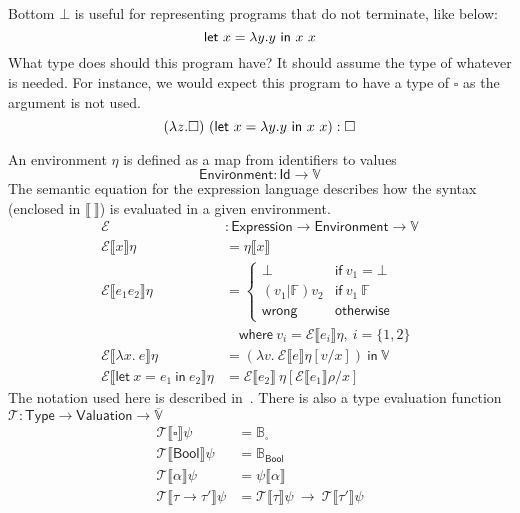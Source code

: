 Bottom $\bot$ is useful for representing programs that do not terminate,
like below:
\[\mathsf{let} \ x = \lambda y. y \ \mathsf{in} \ x \ x\]
What type does should this program have? It should assume the
type of whatever is needed. For instance, we would expect this program
to have a type of $\square$ as the argument is not used.
\[ (\lambda z. \square) \ (\mathsf{let} \ x = \lambda y. y \ \mathsf{in} \ x \ x) : \square \]


An environment $\eta$ is defined as a map from identifiers to values
\[ \mathsf{Environment} : \mathsf{Id} \rightarrow \mathbb{V} \]
The semantic equation for the expression language describes how the
syntax (enclosed in $\llbracket\ \rrbracket$) is evaluated in a given environment.
\begin{align*}
  \mathcal{E} &: \mathsf{Expression} \rightarrow \mathsf{Environment} \rightarrow
  \mathbb{V} \\
  \mathcal{E} \llbracket x \rrbracket \eta
  &= \eta \llbracket x \rrbracket \\
  \mathcal{E} \llbracket e_1 e_2 \rrbracket \eta
  &=
    \begin{cases}
      \bot & \mathsf{if} \ v_1 = \bot \\
      (v_1 | \mathbb{F}) v_2 & \mathsf{if} \ v_1 \ \mathbb{F} \\
      \mathsf{wrong} & \mathsf{otherwise}
    \end{cases}
  \\
  & \quad \textsf{where} \ v_i = \mathcal{E} \llbracket e_i \rrbracket \eta , \ i = \{
    1, 2\} \\
  \mathcal{E} \llbracket \lambda x . \ e \rrbracket \eta
  &=
    (\lambda v . \ \mathcal{E} \llbracket e \rrbracket \eta [v / x ])
    \ \mathsf{in} \ \mathbb{V} \\
  \mathcal{E} \llbracket \textsf{let} \ x = e_1 \ \textsf{in} \ e_2 \rrbracket \eta
  &=
    \mathcal{E} \llbracket e_2 \rrbracket \ \eta [ \mathcal{E} \llbracket e_1 \rrbracket\rho / x ]
\end{align*}
The notation used here is described in~\cite{milner1978,damas1984}.
There is also a type evaluation function $\mathcal{T} : \mathsf{Type}
\rightarrow \mathsf{Valuation} \rightarrow \overline{\mathbb{V}}$
\begin{align*}
  \mathcal{T}\llbracket \square \rrbracket\psi &= \mathbb{B}_{ \square } \\
  \mathcal{T}\llbracket \mathsf{Bool} \rrbracket \psi &= \mathbb{B}_{\mathsf{Bool}} \\
  \mathcal{T}\llbracket \alpha \rrbracket \psi &= \psi \llbracket \alpha \rrbracket \\
  \mathcal{T} \llbracket \tau \rightarrow \tau' \rrbracket \psi &= \mathcal{T}\llbracket \tau \rrbracket \psi \ \rightarrow \
                             \mathcal{T} \llbracket \tau' \rrbracket \psi
\end{align*}

